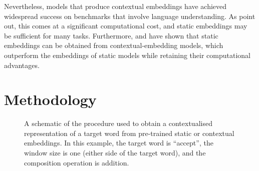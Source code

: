 Nevertheless, models that produce contextual embeddings have achieved widespread
success on benchmarks that involve language understanding.
As \textcite{Arora2020} point out, this comes at a significant computational cost, and
static embeddings may be sufficient for many tasks.
Furthermore, \textcite{Gupta2019} and \textcite{Bommasani2020} have shown that
static embeddings can be obtained from contextual-embedding models, which outperform
the embeddings of static models while retaining their computational advantages.

\section{Methodology}

\begin{figure}
  \label{fig:schematic-procedure}
  \centering
  \newcommand{\period}{\text{.}}
  \newcommand*{\orawidest}{accept}
  \newcommand*{\oratallest}{\#\#}
  \newlength{\orawidth}
  \settowidth{\orawidth}{\orawidest}
  \newcommand*{\ora}[1]{\overrightarrow{#1\vphantom{\oratallest}}}
  \caption{A schematic of the procedure used to obtain a contextualised representation
    of a target word from pre-trained static or contextual embeddings. In this example,
    the target word is ``accept'', the window size is one (either side of the target
    word), and the composition operation is addition.}
\end{figure}


